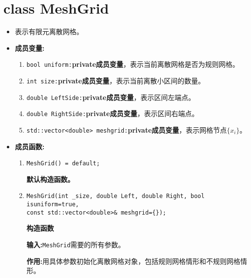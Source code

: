 \documentclass[UTF8]{ctexart}
\theoremstyle{plain}
\theoremstyle{definition}
\theoremstyle{remark}
\begin{document}
\section{class MeshGrid}
\begin{itemize}
    \item 表示有限元离散网格。
    \item \textbf{成员变量:}
    \begin{enumerate}
        \item \texttt{bool uniform:}\textbf{private成员变量}，表示当前离散网格是否为规则网格。
        \item \texttt{int size:}\textbf{private成员变量}，表示当前离散小区间的数量。
        \item \texttt{double LeftSide:}\textbf{private成员变量}，表示区间左端点。
        \item \texttt{double RightSide:}\textbf{private成员变量}，表示区间右端点。
        \item \texttt{std::vector<double> meshgrid:}\textbf{private成员变量}，表示网格节点$\{x_{i}\}$。
    \end{enumerate}
    \item \textbf{成员函数:}
    \begin{enumerate}
        \item \texttt{MeshGrid() = default;}
        
        \textbf{默认构造函数。}

        \item \texttt{MeshGrid(int \_size, double Left, double Right, bool isuniform=true,\\ const std::vector<double>\& meshgrid=\{\});}
        
        \textbf{构造函数}

        \textbf{输入:}\texttt{MeshGrid}需要的所有参数。

        \textbf{作用:}用具体参数初始化离散网格对象，包括规则网格情形和不规则网格情形。
    \end{enumerate}
\end{itemize}
\end{document}
